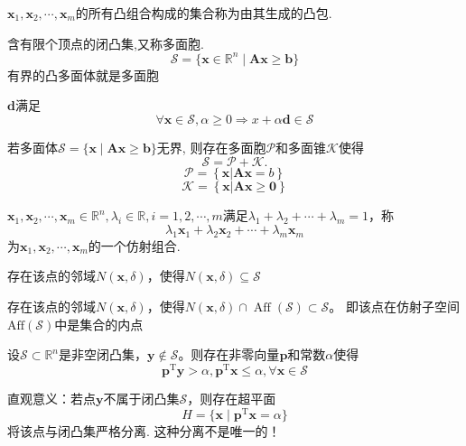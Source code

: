 \begin{definition}[凸包]
    $\boldsymbol{x}_1,\boldsymbol{x}_2,\cdots,\boldsymbol{x}_m$的所有凸组合构成的集合称为由其生成的凸包.
\end{definition}
\begin{definition}[多面胞]
    含有限个顶点的闭凸集,又称多面胞.
    \[
        \mathcal{S}=\{\boldsymbol{x}\in\mathbb{R}^{n}\mid\boldsymbol{A}\boldsymbol{x}\geqslant\boldsymbol{b}\}
    \]
    有界的凸多面体就是多面胞
\end{definition}
\begin{definition}[回收方向]
    $\boldsymbol{d}$满足
    \[
        \forall\boldsymbol{x}\in\mathcal{S},\alpha\geqslant0\Longrightarrow x+\alpha\boldsymbol{d}\in\mathcal{S}
    \]
\end{definition}
\begin{theorem}
    若多面体$\mathcal{S}=\{\boldsymbol{x}\mid\boldsymbol{A}\boldsymbol{x}\geqslant\boldsymbol{b}\}$无界, 则存在多面胞$\mathcal{P}$和多面锥$\mathcal{K}$使得
    \[
        \mathcal{S}=\mathcal{P}+\mathcal{K}.
    \]
    \[
        \mathcal{P} = \left\{ \boldsymbol{x}|\boldsymbol{Ax} = b \right\}
    \]
    \[
        \mathcal{K} = \left\{ \boldsymbol{x}|\boldsymbol{Ax} \geqslant \boldsymbol{0} \right\}
    \]
\end{theorem}
\begin{definition}[仿射集]
    $\boldsymbol{x}_1,\boldsymbol{x}_2,\cdots,\boldsymbol{x}_m\in\mathbb{R}^n,\lambda_i\in \mathbb{R},i=1,2,\cdots,m$满足$\lambda_{1}+\lambda_{2}+\cdots+\lambda_{m}=1$，称
    \[
        \lambda_1\boldsymbol{x}_1+\lambda_2\boldsymbol{x}_2+\cdots+\lambda_m\boldsymbol{x}_m
    \]
    为$\boldsymbol{x}_1,\boldsymbol{x}_2,\cdots,\boldsymbol{x}_m$的一个仿射组合.
\end{definition}
\begin{definition}[内点]
    存在该点的邻域$N(\boldsymbol{x},\delta)$，使得$N(\boldsymbol{x},\delta)\subseteq \mathcal{S}$
\end{definition}
\begin{definition}[相对内点]
    存在该点的邻域$N(\boldsymbol{x},\delta)$，使得$N(\boldsymbol{x},\delta)\cap \operatorname{Aff}(\mathcal{S})\subset \mathcal{S}$。
    即该点在仿射子空间$\operatorname{Aff(\mathcal{S})}$中是集合的内点
\end{definition}
\begin{theorem}[凸集分离定理]
    设$\mathcal{S}\subset \mathbb{R}^n$是非空闭凸集，$\boldsymbol{y}\notin \mathcal{S}$。则存在非零向量$\boldsymbol{p}$和常数$\alpha$使得
    \[
        \boldsymbol{p}^{\mathrm{T}}\boldsymbol{y}>\alpha,\boldsymbol{p}^{\mathrm{T}}\boldsymbol{x}\leqslant\alpha,\forall \boldsymbol{x}\in\mathcal{S}
    \]

    直观意义：若点$\boldsymbol{y}$不属于闭凸集$\mathcal{S}$，则存在超平面
    \[
        H=\{\boldsymbol{x}\mid\boldsymbol{p}^{\mathrm{T}}\boldsymbol{x}=\alpha\}
    \]
    将该点与闭凸集严格分离.
    \colorbox{red!50}{这种分离不是唯一的！}
\end{theorem}
